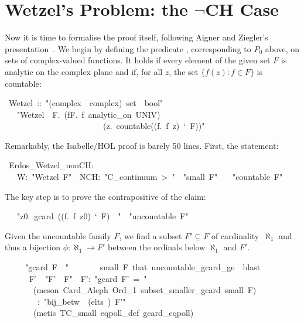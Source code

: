 \documentclass[runningheads]{llncs}
\begin{document}
\section{Wetzel's Problem: the $\neg$CH Case}

Now it is time to formalise the proof itself, following Aigner and Ziegler's presentation~\cite{aigner-proofs}.
We begin by defining the predicate , corresponding to $P_0$ above, on sets of complex-valued functions. It holds if every element of the given set $F$ is analytic on the complex plane and if, for all $z$, the set $\{f(z) : f\in F\}$ is countable:
\begin{isabelle}
\ Wetzel\ ::\ "(complex\ \isasymRightarrow \ complex)\ set\ \isasymRightarrow \ bool"\isanewline
\ \ \ "Wetzel\ \isasymequiv \ \isasymlambda F.\ (\isasymforall f\isasymin F.\ f\ analytic\_on\ UNIV)\ \isasymand\isanewline
\ \ \ \ \ \ \ \ \ \ \ \ \ \ \ \ \ \ \ \ \ \ \ \ (\isasymforall z.\ countable((\isasymlambda f.\ f\ z)\ `\ F))"
\end{isabelle}

Remarkably, the Isabelle/HOL proof is barely 50 lines. First, the statement:
\begin{isabelle}
\ Erdos\_Wetzel\_nonCH:\isanewline
\ \ \ W:\ "Wetzel\ F"\ \ NCH:\ "C\_continuum\ >\ "\ \ "small\ F"\isanewline
\ \ \ "countable\ F"
\end{isabelle}

The key step is to prove the contrapositive of the claim:
\begin{isabelle}
\ \ \ "\isasymexists z0.\ gcard\ ((\isasymlambda f.\ f\ z0)\ `\ F)\ \isasymge \ "\ \ "uncountable\ F"
\end{isabelle}

\noindent
Given the uncountable family $F$, we find a subset $F'\subseteq F$ of cardinality~$\aleph_1$  and thus a bijection $\phi:\aleph_1\to F'$  between the ordinals below $\aleph_1$ and $F'$.
\begin{isabelle}
\ \ \ \ \ "gcard\ F\ \isasymge \ "\isanewline
\ \ \ \ \ \ \ \isacartoucheopen small\ F\isacartoucheclose \ that\ uncountable\_gcard\_ge\ \ blast\ \isanewline
\ \ \ \ \ \ F'\ \ "F'\ \isasymsubseteq \ F"\ \ F':\ "gcard\ F'\ =\ "\isanewline
\ \ \ \ \ \ \ (meson\ Card\_Aleph\ Ord\_1\ subset\_smaller\_gcard\ \isacartoucheopen small\ F\isacartoucheclose )\isanewline
\ \ \ \ \ \ \isasymphi \ \ \isasymphi :\ "bij\_betw\ \isasymphi \ (elts\ )\ F'"\isanewline
\ \ \ \ \ \ \ (metis\ TC\_small\ eqpoll\_def\ gcard\_eqpoll)
\end{isabelle}
\end{document}
